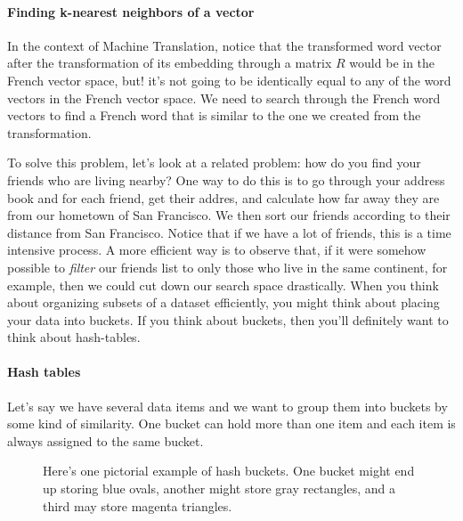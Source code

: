 \documentclass[12pt]{article}
\begin{document}
\paragraph{Finding k-nearest neighbors of a vector} In the context of Machine Translation, notice that the transformed word vector after the transformation of its embedding through a matrix $R$ would be in the French vector space, but! it's not going to be identically equal to any of the word vectors in the French vector space. We need to search through the French word vectors to find a French word that is similar to the one we created from the transformation.

To solve this problem, let's look at a related problem: how do you find your friends who are living nearby? One way to do this is to go through your address book and for each friend, get their addres, and calculate how far away they are from our hometown of San Francisco. We then sort our friends according to their distance from San Francisco. Notice that if we have a lot of friends, this is a time intensive process. A more efficient way is to observe that, if it were somehow possible to \emph{filter} our friends list to only those who live in the same continent, for example, then we could cut down our search space drastically. When you think about organizing subsets of a dataset efficiently, you might think about placing your data into buckets. If you think about buckets, then you'll definitely want to think about hash-tables.

\paragraph{Hash tables} Let's say we have several data items and we want to group them into buckets by some kind of similarity. One bucket can hold more than one item and each item is always assigned to the same bucket.

\begin{figure}[h]
\begin{center}
\end{center}
\caption{Here's one pictorial example of hash buckets. One bucket might end up storing blue ovals, another might store gray rectangles, and a third may store magenta triangles.}
\end{figure}
\end{document}
